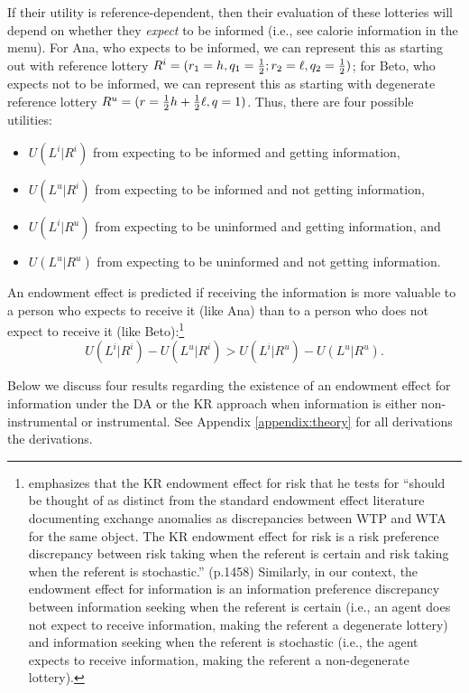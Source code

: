 If their utility is reference-dependent, then their evaluation of these lotteries will depend on whether they \emph{expect} to be informed (i.e., see calorie information in the menu). For Ana, who expects to be informed, we can represent this as starting out with reference lottery $R^i=(r_1=h,q_1=\tfrac{1}{2};r_2=\ell,q_2=\tfrac{1}{2})$; for Beto, who expects not to be informed, we can represent this as starting with degenerate reference lottery $R^u=(r=\tfrac{1}{2} h + \tfrac{1}{2} \ell,q=1)$. Thus, there are four possible utilities:
\begin{itemize}
	\item $U(L^i|R^i)$ from expecting to be informed and getting information,
	\item $U(L^u|R^i)$ from expecting to be informed and not getting information,
	\item $U(L^i|R^u)$ from expecting to be uninformed and getting information, and
  \item $U(L^u|R^u)$ from expecting to be uninformed and not getting information.
\end{itemize}

An endowment effect is predicted if receiving the information is more valuable to a person who expects to receive it (like Ana) than to a person who does not expect to receive it (like Beto):\footnote{\citet{sprengerEndowmentEffectRisk2015} emphasizes that the KR endowment effect for risk that he tests for \enquote{should be thought of as distinct from the standard endowment effect literature documenting exchange anomalies as discrepancies between WTP and WTA for the same object. The KR endowment effect for risk is a risk preference discrepancy between risk taking when the referent is certain and risk taking when the referent is stochastic.} (p.1458) Similarly, in our context, the endowment effect for information is an information preference discrepancy between information seeking when the referent is certain (i.e., an agent does not expect to receive information, making the referent a degenerate lottery) and information seeking when the referent is stochastic (i.e., the agent expects to receive information, making the referent a non-degenerate lottery).}
\begin{equation}
  U(L^i|R^i)-U(L^u|R^i)>U(L^i|R^u)-U(L^u|R^u).
  \label{eq:endowmentEffect}
\end{equation}

Below we discuss four results regarding the existence of an endowment effect for information under the DA or the KR approach when information is either non-instrumental or instrumental. See Appendix \ref{appendix:theory} for all derivations the derivations.

